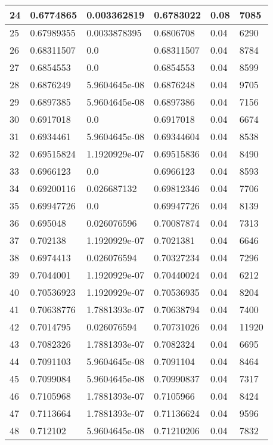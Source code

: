 \begin{longtable}{|l|l|l|l|l|l|}
24 & 0.6774865 & 0.003362819 & 0.6783022 & 0.08 & 7085 \\ \hline 
25 & 0.67989355 & 0.0033878395 & 0.6806708 & 0.04 & 6290 \\ \hline 
26 & 0.68311507 & 0.0 & 0.68311507 & 0.04 & 8784 \\ \hline 
27 & 0.6854553 & 0.0 & 0.6854553 & 0.04 & 8599 \\ \hline 
28 & 0.6876249 & 5.9604645e-08 & 0.6876248 & 0.04 & 9705 \\ \hline 
29 & 0.6897385 & 5.9604645e-08 & 0.6897386 & 0.04 & 7156 \\ \hline 
30 & 0.6917018 & 0.0 & 0.6917018 & 0.04 & 6674 \\ \hline 
31 & 0.6934461 & 5.9604645e-08 & 0.69344604 & 0.04 & 8538 \\ \hline 
32 & 0.69515824 & 1.1920929e-07 & 0.69515836 & 0.04 & 8490 \\ \hline 
33 & 0.6966123 & 0.0 & 0.6966123 & 0.04 & 8593 \\ \hline 
34 & 0.69200116 & 0.026687132 & 0.69812346 & 0.04 & 7706 \\ \hline 
35 & 0.69947726 & 0.0 & 0.69947726 & 0.04 & 8139 \\ \hline 
36 & 0.695048 & 0.026076596 & 0.70087874 & 0.04 & 7313 \\ \hline 
37 & 0.702138 & 1.1920929e-07 & 0.7021381 & 0.04 & 6646 \\ \hline 
38 & 0.6974413 & 0.026076594 & 0.70327234 & 0.04 & 7296 \\ \hline 
39 & 0.7044001 & 1.1920929e-07 & 0.70440024 & 0.04 & 6212 \\ \hline 
40 & 0.70536923 & 1.1920929e-07 & 0.70536935 & 0.04 & 8204 \\ \hline 
41 & 0.70638776 & 1.7881393e-07 & 0.70638794 & 0.04 & 7400 \\ \hline 
42 & 0.7014795 & 0.026076594 & 0.70731026 & 0.04 & 11920 \\ \hline 
43 & 0.7082326 & 1.7881393e-07 & 0.7082324 & 0.04 & 6695 \\ \hline 
44 & 0.7091103 & 5.9604645e-08 & 0.7091104 & 0.04 & 8464 \\ \hline 
45 & 0.7099084 & 5.9604645e-08 & 0.70990837 & 0.04 & 7317 \\ \hline 
46 & 0.7105968 & 1.7881393e-07 & 0.7105966 & 0.04 & 8424 \\ \hline 
47 & 0.7113664 & 1.7881393e-07 & 0.71136624 & 0.04 & 9596 \\ \hline 
48 & 0.712102 & 5.9604645e-08 & 0.71210206 & 0.04 & 7832 \\ \hline 

\end{longtable}
